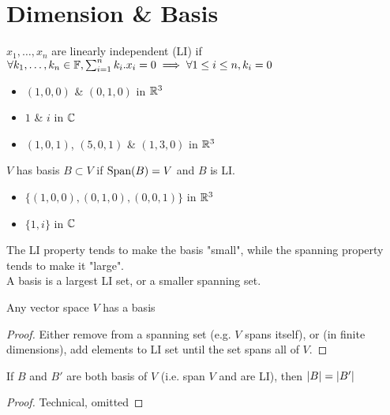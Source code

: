 \section{Dimension \& Basis}
\begin{definition}
	$x_1,\dots,x_n$ are linearly independent (LI) if $\forall k_1,\dots,k_n \in \mathbb{F}, \sum_{i=1}^{n}k_i.x_i = 0 \implies \forall 1 \leq i \leq n, k_i=0$
\end{definition}
\begin{example}
	\begin{itemize}
		\item $(1,0,0)$ \& $(0,1,0)$ in $\mathbb{R}^3$
		\item $1$ \& $i$ in $\mathbb{C}$
		\item $(1,0,1)$, $(5,0,1)$ \& $(1,3,0)$ in $\mathbb{R}^3$
	\end{itemize}
\end{example}
\begin{definition}
	$V$ has basis $B \subset V$ if $\text{Span}(B)=V$ and $B$ is LI.
\end{definition}
\begin{example}
	\begin{itemize}
		\item $\{(1,0,0), (0,1,0), (0,0,1)\}$ in $\mathbb{R}^3$
		\item $\{1,i\}$ in $\mathbb{C}$
	\end{itemize}
\end{example}
The LI property tends to make the basis "small", while the spanning property tends to make it "large".\\
A basis is a largest LI set, or a smaller spanning set.
\begin{property}
	Any vector space $V$ has a basis
\end{property}
\begin{proof}
	Either remove from a spanning set (e.g. $V$ spans itself), or (in finite dimensions), add elements to LI set until the set spans all of $V$.
\end{proof}
\begin{property}
	If $B$ and $B'$ are both basis of $V$ (i.e. span $V$ and are LI), then $| B |=| B' |$
\end{property}
\begin{proof}
	Technical, omitted
\end{proof}

